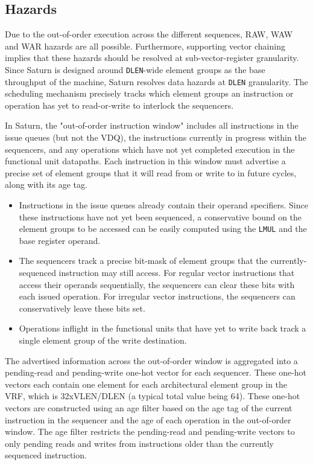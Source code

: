 \subsection{Hazards}

Due to the out-of-order execution across the different sequences, RAW, WAW and WAR hazards are all possible.
Furthermore, supporting vector chaining implies that these hazards should be resolved at sub-vector-register granularity.
Since Saturn is designed around \texttt{DLEN}-wide element groups as the base throughput of the machine, Saturn resolves data hazards at \texttt{DLEN} granularity.
The scheduling mechanism precisely tracks which element groups an instruction or operation has yet to read-or-write to interlock the sequencers.

In Saturn, the "out-of-order instruction window" includes all instructions in the issue queues (but not the VDQ), the instructions currently in progress within the sequencers, and any operations which have not yet completed execution in the functional unit datapaths.
Each instruction in this window must advertise a precise set of element groups that it will read from or write to in future cycles, along with its age tag.

\begin{itemize}
\item Instructions in the issue queues already contain their operand specifiers. Since these instructions have not yet been sequenced, a conservative bound on the element groups to be accessed can be easily computed using the \texttt{LMUL} and the base register operand.
\item The sequencers track a precise bit-mask of element groups that the currently-sequenced instruction may still access. For regular vector instructions that access their operands sequentially, the sequencers can clear these bits with each issued operation. For irregular vector instructions, the sequencers can conservatively leave these bits set.
\item Operations inflight in the functional units that have yet to write back track a single element group of the write destination.
\end{itemize}
 
The advertised information across the out-of-order window is aggregated into a pending-read and pending-write one-hot vector for each sequencer.
These one-hot vectors each contain one element for each architectural element group in the VRF, which is 32xVLEN/DLEN (a typical total value being 64).
These one-hot vectors are constructed using an age filter based on the age tag of the current instruction in the sequencer and the age of each operation in the out-of-order window.
The age filter restricts the pending-read and pending-write vectors to only pending reads and writes from instructions older than the currently sequenced instruction.

